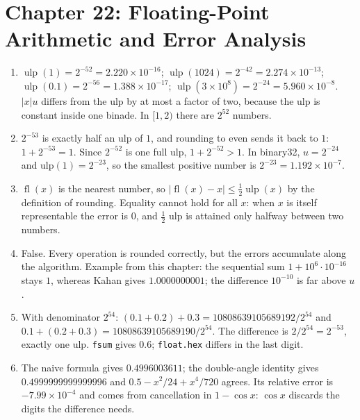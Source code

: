 \section*{Chapter 22: Floating-Point Arithmetic and Error Analysis}
\begin{enumerate}[label=\textbf{22.\arabic*}]
  \item $\operatorname{ulp}(1)=2^{-52}=2.220\times10^{-16}$;
        $\operatorname{ulp}(1024)=2^{-42}=2.274\times10^{-13}$;
        $\operatorname{ulp}(0.1)=2^{-56}=1.388\times10^{-17}$;
        $\operatorname{ulp}(3\times10^{8})=2^{-24}=5.960\times10^{-8}$.
        $|x|u$ differs from the ulp by at most a factor of two, because the ulp is constant
        inside one binade. In $[1,2)$ there are $2^{52}$ numbers.

  \item $2^{-53}$ is exactly half an ulp of $1$, and rounding to even sends it back
        to $1$: $1+2^{-53}=1$. Since $2^{-52}$ is one full ulp,
        $1+2^{-52}>1$. In binary32, $u=2^{-24}$ and ulp$(1)=2^{-23}$, so the smallest
        positive number is $2^{-23}=1.192\times10^{-7}$.

  \item $\operatorname{fl}(x)$ is the nearest number, so
        $|\operatorname{fl}(x)-x|\le\tfrac12\operatorname{ulp}(x)$ by the definition of
        rounding. Equality cannot hold for all $x$: when $x$ is itself representable the
        error is $0$, and $\tfrac12$ ulp is attained only halfway between two numbers.

  \item False. Every operation is rounded correctly, but the errors accumulate along the
        algorithm. Example from this chapter: the sequential sum $1+10^{6}\cdot10^{-16}$
        stays $1$, whereas Kahan gives $1.0000000001$; the difference $10^{-10}$
        is far above $u$.

  \item With denominator $2^{54}$: $(0.1+0.2)+0.3=10808639105689192/2^{54}$ and
        $0.1+(0.2+0.3)=10808639105689190/2^{54}$. The difference is $2/2^{54}=2^{-53}$,
        exactly one ulp. \texttt{fsum} gives $0.6$; \texttt{float.hex} differs in the
        last digit.

  \item The naive formula gives $0.4996003611$; the double-angle
        identity gives $0.4999999999999996$ and $0.5-x^{2}/24+x^{4}/720$
        agrees. Its relative error is $-7.99\times10^{-4}$ and comes from
        cancellation in $1-\cos x$: $\cos x$ discards the digits the difference needs.


\end{enumerate}
